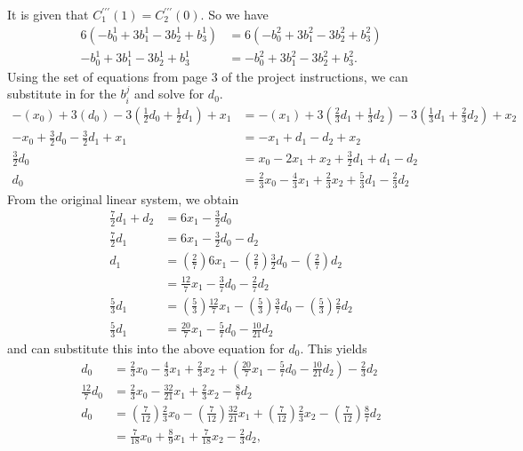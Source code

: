 \documentclass[paper=a4, fontsize=11pt]{scrartcl} %
\begin{document}
It is given that $C^{\prime\prime\prime}_1(1) = C^{\prime\prime\prime}_2(0)$. So we have
\begin{align*}
    6(-b_0^1 + 3b_1^1 -3b_2^1 +b_3^1) &=
    6(-b_0^2 + 3b_1^2 -3b_2^2 +b_3^2) \\
    -b_0^1 + 3b_1^1 -3b_2^1 +b_3^1 &=
    -b_0^2 + 3b_1^2 -3b_2^2 +b_3^2 .
\end{align*}
Using the set of equations from page $3$ of the project instructions, we can substitute in for the $b_i^j$ and solve for $d_0$.
\begin{align*}
    -(x_0) + 3(d_0) - 3(\frac{1}{2}d_0 + \frac{1}{2}d_1) + x_1 &=
    -(x_1) + 3(\frac{2}{3} d_1 + \frac{1}{3}d_2) - 3(\frac{1}{3}d_1 +         \frac{2}{3}d_2) + x_2 \\
    -x_0 + \frac{3}{2}d_0 - \frac{3}{2}d_1 + x_1 &=
    -x_1 + d_1 -d_2 + x_2 \\
    \frac{3}{2}d_0 &=
    x_0 - 2x_1 +x_2 + \frac{3}{2}d_1 + d_1 - d_2 \\
    d_0 &=
    \frac{2}{3}x_0 - \frac{4}{3}x_1 + \frac{2}{3}x_2 + \frac{5}{3}d_1 -     \frac{2}{3}d_2
\end{align*}
From the original linear system, we obtain
\begin{align*}
    \frac{7}{2}d_1 + d_2 &=
    6x_1 - \frac{3}{2}d_0 \\
    \frac{7}{2}d_1 &=
    6x_1 - \frac{3}{2}d_0 - d_2 \\
    d_1 &=
    (\frac{2}{7})6x_1 -(\frac{2}{7}) \frac{3}{2}d_0 -(\frac{2}{7})d_2 \\
    &=
    \frac{12}{7}x_1 - \frac{3}{7}d_0 - \frac{2}{7} d_2 \\
    \frac{5}{3}d_1 &=
    (\frac{5}{3})\frac{12}{7}x_1 - (\frac{5}{3})\frac{3}{7}d_0 -             (\frac{5}{3})\frac{2}{7}d_2 \\
    \frac{5}{3}d_1 &=
    \frac{20}{7}x_1 - \frac{5}{7}d_0 - \frac{10}{21}d_2
\end{align*}
and can substitute this into the above equation for $d_0$. This yields
\begin{align*}
    d_0 &=
    \frac{2}{3}x_0 - \frac{4}{3}x_1 + \frac{2}{3}x_2 + (\frac{20}{7}x_1     - \frac{5}{7}d_0 - \frac{10}{21}d_2) - \frac{2}{3}d_2 \\
    \frac{12}{7}d_0 &=
    \frac{2}{3}x_0 - \frac{32}{21}x_1 +\frac{2}{3}x_2 -\frac{8}{7}d_2 \\
    d_0 &=
    (\frac{7}{12})\frac{2}{3}x_0 - (\frac{7}{12})\frac{32}{21}x_1 +         (\frac{7}{12})\frac{2}{3}x_2 - (\frac{7}{12})\frac{8}{7}d_2 \\
    &=
    \frac{7}{18}x_0 + \frac{8}{9}x_1 + \frac{7}{18}x_2 - \frac{2}{3}d_2,
\end{align*}
\end{document}
